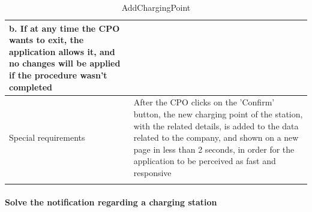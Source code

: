 \begin{center}
\begin{longtable}{p{4cm} p{11cm}}
                    b. If at any time the CPO wants to exit, the application allows it, and no changes will be applied if the procedure wasn't completed \\
     \hline
     Special requirements & After the CPO clicks on the 'Confirm' button, the new charging point of the station, with the related details, is added to the data related to the company, and shown on a new page in less than 2 seconds, in order for the application to be perceived as fast and responsive \\
     \hline
    \caption{AddChargingPoint}
    \label{tab:AddChargingPoint}
    \end{longtable}
\end{center}

\paragraph{Solve the notification regarding a charging station}
